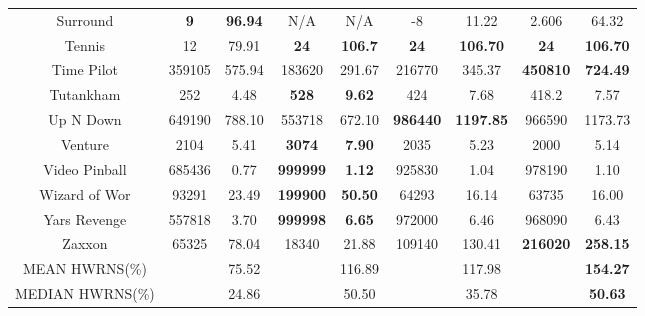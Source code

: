 \documentclass[nohyperref]{article}
\def\GDIHmeanHWRNS{154.27}
\def\GDIHmedianHWRNS{50.63}
\def\GDIImeanHWRNS{117.98}
\def\GDIImedianHWRNS{35.78}
\def\mueslimeanHWRNS{75.52}
\def\mueslimedianHWRNS{24.86}
\def\goexploremeanHWRNS{116.89}
\def\goexploremedianHWRNS{50.50}
\newcommand{\best}[1]{\textbf{#1}}
\theoremstyle{plain}
\begin{document}
\begin{table}[!hb]
\begin{center}
\begin{tabular}{| c | c c |c c |c c |c c |}
 Surround       &\textbf{9}    &\textbf{96.94}             &N/A                    &N/A                            & -8         &11.22               &2.606           &64.32\\
 Tennis         &12            &79.91                           &\best{24}              &\best{106.7}                   & \best{24}         &\best{106.70   }  &\textbf{24}              &\textbf{106.70}          \\
 Time Pilot     &359105 &575.94    &183620                &291.67                         & 216770     & 345.37                    &\textbf{450810}          &\textbf{724.49}\\
 Tutankham      &252           &4.48         &\textbf{528}           &\textbf{9.62}                  & 424               &7.68                       &418.2           &7.57\\
 Up N Down      &649190        &788.10                &553718                &672.10                         & \best{986440}     &\best{1197.85}     &966590          &1173.73      \\
 Venture        &2104          &5.41            &\textbf{3074}         &\textbf{7.90}                & 2035              &5.23                       &2000            &5.14\\
 Video Pinball  &685436        &0.77                 &\textbf{999999}       &\textbf{1.12}               & 925830            &1.04                   &978190          &1.10\\
 Wizard of Wor  &93291         &23.49                &\textbf{199900}       &\textbf{50.50}               & 64293             &16.14                 &63735           &16.00\\
 Yars Revenge   &557818        &3.70               &\textbf{999998}       &\textbf{6.65}               & 972000            &6.46                     &968090          &6.43\\
 Zaxxon         &65325         &78.04                 &18340                 &21.88                        & 109140     &130.41        &\textbf{216020} &\textbf{258.15}  \\
\hline    
MEAN HWRNS(\%)  &    & \mueslimeanHWRNS &                       & \goexploremeanHWRNS                       &            &  \GDIImeanHWRNS  &                  & \textbf{\GDIHmeanHWRNS} \\
\hline
MEDIAN HWRNS(\%)&   & \mueslimedianHWRNS  &                       & \goexploremedianHWRNS              &            & \GDIImedianHWRNS   &                  & \textbf{\GDIHmedianHWRNS} \\
\hline
\end{tabular}
\end{center}
\end{table}
\end{document}
